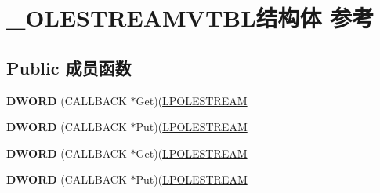 \hypertarget{struct___o_l_e_s_t_r_e_a_m_v_t_b_l}{}\section{\+\_\+\+O\+L\+E\+S\+T\+R\+E\+A\+M\+V\+T\+B\+L结构体 参考}
\label{struct___o_l_e_s_t_r_e_a_m_v_t_b_l}
\subsection*{Public 成员函数}
\begin{DoxyCompactItemize}
\item 
\mbox{\label{struct___o_l_e_s_t_r_e_a_m_v_t_b_l_a5576e5f75b1bc35ebc0fdd26f62ac948}} 
{\bfseries D\+W\+O\+RD} (C\+A\+L\+L\+B\+A\+CK $\ast$Get)(\hyperlink{struct___o_l_e_s_t_r_e_a_m}{L\+P\+O\+L\+E\+S\+T\+R\+E\+AM}
\item 
\mbox{\label{struct___o_l_e_s_t_r_e_a_m_v_t_b_l_a135ab5a7cdb2824d6b50775ca4807f03}} 
{\bfseries D\+W\+O\+RD} (C\+A\+L\+L\+B\+A\+CK $\ast$Put)(\hyperlink{struct___o_l_e_s_t_r_e_a_m}{L\+P\+O\+L\+E\+S\+T\+R\+E\+AM}
\item 
\mbox{\label{struct___o_l_e_s_t_r_e_a_m_v_t_b_l_a5576e5f75b1bc35ebc0fdd26f62ac948}} 
{\bfseries D\+W\+O\+RD} (C\+A\+L\+L\+B\+A\+CK $\ast$Get)(\hyperlink{struct___o_l_e_s_t_r_e_a_m}{L\+P\+O\+L\+E\+S\+T\+R\+E\+AM}
\item 
\mbox{\label{struct___o_l_e_s_t_r_e_a_m_v_t_b_l_a135ab5a7cdb2824d6b50775ca4807f03}} 
{\bfseries D\+W\+O\+RD} (C\+A\+L\+L\+B\+A\+CK $\ast$Put)(\hyperlink{struct___o_l_e_s_t_r_e_a_m}{L\+P\+O\+L\+E\+S\+T\+R\+E\+AM}
\end{DoxyCompactItemize}
